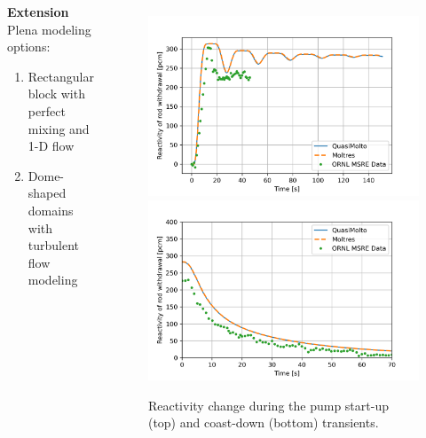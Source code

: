 \begin{frame}
\begin{columns}
\begin{block}{\textbf{Extension}}
      Plena modeling options:
      \begin{enumerate}
        \item Rectangular block with perfect mixing and 1-D flow
        \item Dome-shaped domains with turbulent flow modeling
      \end{enumerate}
    \end{block}
    \column[t]{4.5cm}
    \begin{figure}
      \centering
      \includegraphics[width=.9\columnwidth]{images/start-up-v2-reactivity}
      \includegraphics[width=.9\columnwidth]{images/coast-down-v2-reactivity}
      \caption{Reactivity change during the pump start-up (top) and coast-down (bottom)
      transients.}
    \end{figure}
  \end{columns}
\end{frame}

